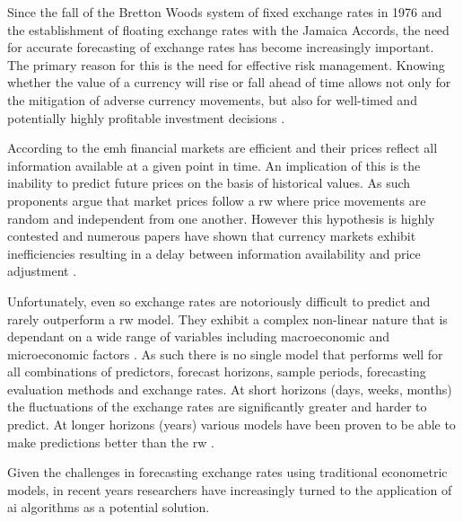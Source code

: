 Since the fall of the Bretton Woods system of fixed exchange rates in 1976 and the establishment of floating exchange rates with the Jamaica Accords, the need for accurate forecasting of exchange rates has become increasingly important. The primary reason for this is the need for effective risk management. Knowing whether the value of a currency will rise or fall ahead of time allows not only for the mitigation of adverse currency movements, but also for well-timed and potentially highly profitable investment decisions \cite{lstm-mlp-rf,deep-learning}.

According to the \gls{emh} \cite{efficient-market-hypothesis} financial markets are efficient and their prices reflect all information available at a given point in time. An implication of this is the inability to predict future prices on the basis of historical values. As such proponents argue that market prices follow a \gls{rw} where price movements are random and independent from one another. However this hypothesis is highly contested and numerous papers have shown that currency markets exhibit inefficiencies resulting in a delay between information availability and price adjustment \cite{adaptive-markets,event-study-analysis}.

Unfortunately, even so exchange rates are notoriously difficult to predict and rarely outperform a \gls{rw} model. They exhibit a complex non-linear nature that is dependant on a wide range of variables including macroeconomic and microeconomic factors \cite{factors}.  As such there is no single model that performs well for all combinations of predictors, forecast horizons, sample periods, forecasting evaluation methods and exchange rates. At short horizons (days, weeks, months) the fluctuations of the exchange rates are significantly greater and harder to predict. At longer horizons (years) various models have been proven to be able to make predictions better than the \gls{rw} \cite{predictability}.

Given the challenges in forecasting exchange rates using traditional econometric models, in recent years researchers have increasingly turned to the application of \gls{ai} algorithms as a potential solution.

